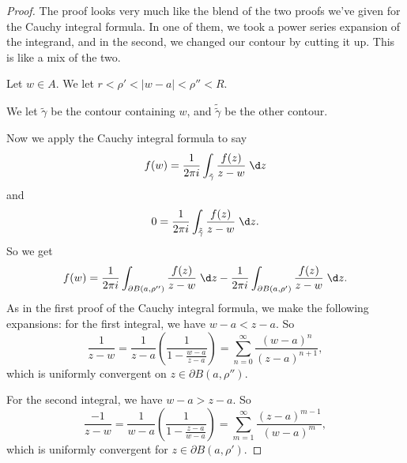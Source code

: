 \documentclass[a4paper]{article}
\begin{document}
\begin{proof}
  The proof looks very much like the blend of the two proofs we've given for the Cauchy integral formula. In one of them, we took a power series expansion of the integrand, and in the second, we changed our contour by cutting it up. This is like a mix of the two.

  Let $w \in A$. We let $r < \rho' < | w- a| < \rho'' < R$.
  \begin{center}
  \end{center}
  We let $\tilde{\gamma}$ be the contour containing $w$, and $\tilde{\tilde{\gamma}}$ be the other contour.

  Now we apply the Cauchy integral formula to say
  \[
    f(w) = \frac{1}{2\pi i} \int_{\tilde{\gamma}}\frac{f(z)}{z - w}\;\d z
  \]
  and
  \[
    0 = \frac{1}{2\pi i} \int_{\tilde{\tilde{\gamma}}} \frac{f(z)}{z - w} \;\d z.
  \]
  So we get
  \[
    f(w) = \frac{1}{2\pi i} \int_{\partial B(a, \rho'')} \frac{f(z)}{z - w}\;\d z - \frac{1}{2\pi i} \int_{\partial B(a, \rho')} \frac{f(z)}{z - w}\;\d z.
  \]
  As in the first proof of the Cauchy integral formula, we make the following expansions: for the first integral, we have $w - a < z - a$. So
  \[
    \frac{1}{z - w} = \frac{1}{z - a} \left(\frac{1}{1 - \frac{w - a}{z - a}}\right) = \sum_{n = 0}^\infty \frac{(w - a)^n}{(z - a)^{n + 1}},
  \]
  which is uniformly convergent on $z \in \partial B(a, \rho'')$.

  For the second integral, we have $w - a> z - a$. So
  \[
    \frac{-1}{z - w} = \frac{1}{w - a} \left(\frac{1}{1 - \frac{z - a}{w - a}}\right) = \sum_{m = 1}^\infty \frac{(z - a)^{m - 1}}{(w - a)^m},
  \]
  which is uniformly convergent for $z \in \partial B(a, \rho')$.


\end{proof}
\end{document}
